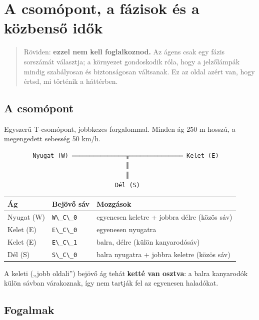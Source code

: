 \hypertarget{a-csomuxf3pont-a-fuxe1zisok-uxe9s-a-kuxf6zbensux151-idux151k}{%
\section{A csomópont, a fázisok és a
közbenső
idők}\label{a-csomuxf3pont-a-fuxe1zisok-uxe9s-a-kuxf6zbensux151-idux151k}}

\begin{quote}
Röviden: \textbf{ezzel nem kell
foglalkoznod.} Az ágens csak egy fázis
sorszámát választja; a környezet
gondoskodik róla, hogy a jelzőlámpák
mindig szabályosan és biztonságosan
váltsanak. Ez az oldal azért van, hogy
értsd, mi történik a háttérben.
\end{quote}

\hypertarget{a-csomuxf3pont}{%
\subsection{A
csomópont}\label{a-csomuxf3pont}}

Egyszerű T-csomópont, jobbkezes
forgalommal. Minden ág 250 m hosszú, a
megengedett sebesség 50 km/h.

\begin{lstlisting}
        Nyugat (W) ═══════════════╦═══════════════ Kelet (E)
                                  ║
                                  ║
                               Dél (S)
\end{lstlisting}

\begin{longtable}[]{@{}lll@{}}
\toprule\noalign{}
Ág & Bejövő sáv & Mozgások \\
\midrule\noalign{}
\endhead
\bottomrule\noalign{}
\endlastfoot
Nyugat (W) &
\passthrough{\lstinline!W\_C\_0!} &
egyenesen keletre + jobbra délre (közös
sáv) \\
Kelet (E) &
\passthrough{\lstinline!E\_C\_0!} &
egyenesen nyugatra \\
Kelet (E) &
\passthrough{\lstinline!E\_C\_1!} &
balra, délre (külön kanyarodósáv) \\
Dél (S) &
\passthrough{\lstinline!S\_C\_0!} &
balra nyugatra + jobbra keletre (közös
sáv) \\
\end{longtable}

A keleti („jobb oldali'') bejövő ág
tehát \textbf{ketté van osztva}: a balra
kanyarodók külön sávban várakoznak, így
nem tartják fel az egyenesen haladókat.

\hypertarget{fogalmak}{%
\subsection{Fogalmak}\label{fogalmak}}

